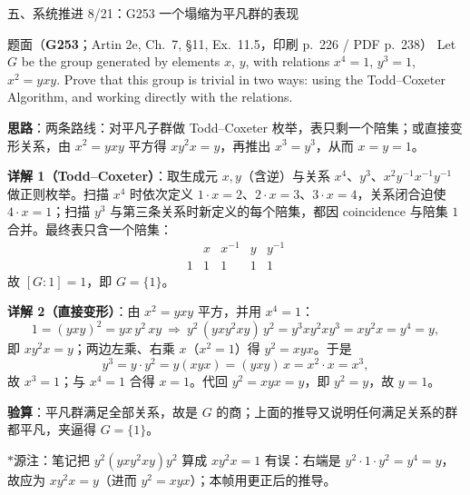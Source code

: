 \documentclass[aspectratio=169,10pt,fontset=none]{ctexbeamer}
\newcommand{\ex}[1]{\textcolor{accent}{\footnotesize\bfseries #1}}
\newcommand{\key}[1]{\textcolor{ink}{\bfseries #1}}
\newcommand{\starpt}{\textcolor{accent}{\bfseries$\ast$}}
\begin{document}
\begin{frame}[t]{五、系统推进 8/21：G253 一个塌缩为平凡群的表现}
\label{ex:G253}
\scriptsize
\begin{block}{\footnotesize 题面（\ex{G253}；Artin 2e, Ch.~7, §11, Ex.~11.5，印刷 p.~226 / PDF p.~238）}
Let $G$ be the group generated by elements $x$, $y$, with relations $x^4=1$, $y^3=1$,
$x^2=yxy$. Prove that this group is trivial in two ways: using the Todd--Coxeter
Algorithm, and working directly with the relations.
\end{block}
\key{思路}：两条路线：对平凡子群做 Todd--Coxeter 枚举，表只剩一个陪集；或直接变形关系，由 $x^2=yxy$ 平方得 $xy^2x=y$，再推出 $x^3=y^3$，从而 $x=y=1$。

\key{详解 1（Todd--Coxeter）}：取生成元 $x,y$（含逆）与关系 $x^4$、$y^3$、$x^2y^{-1}x^{-1}y^{-1}$ 做正则枚举。扫描 $x^4$ 时依次定义 $1\cdot x=2$、$2\cdot x=3$、$3\cdot x=4$，关系闭合迫使 $4\cdot x=1$；扫描 $y^3$ 与第三条关系时新定义的每个陪集，都因 coincidence 与陪集 $1$ 合并。最终表只含一个陪集：
\[
\begin{array}{c|cccc}
 & x & x^{-1} & y & y^{-1}\\ \hline
1 & 1 & 1 & 1 & 1
\end{array}
\]
故 $[G:1]=1$，即 $G=\{1\}$。

\key{详解 2（直接变形）}：由 $x^2=yxy$ 平方，并用 $x^4=1$：
\[
1=(yxy)^2=yx\,y^2\,xy\ \Longrightarrow\ y^2\,(yx y^2 xy)\,y^2=y^3 x y^2 x y^3=x y^2 x=y^4=y,
\]
即 $xy^2x=y$；两边左乘、右乘 $x$（$x^2=1$）得 $y^2=xyx$。于是
\[
y^3=y\cdot y^2=y(xyx)=(yxy)\,x=x^2\cdot x=x^3,
\]
故 $x^3=1$；与 $x^4=1$ 合得 $x=1$。代回 $y^2=xyx=y$，即 $y^2=y$，故 $y=1$。

\key{验算}：平凡群满足全部关系，故是 $G$ 的商；上面的推导又说明任何满足关系的群都平凡，夹逼得 $G=\{1\}$。

\starpt 源注：笔记把 $y^2(yxy^2xy)y^2$ 算成 $xy^2x=1$ 有误：右端是 $y^2\cdot 1\cdot y^2=y^4=y$，故应为 $xy^2x=y$（进而 $y^2=xyx$）；本帧用更正后的推导。
\end{frame}
\end{document}
